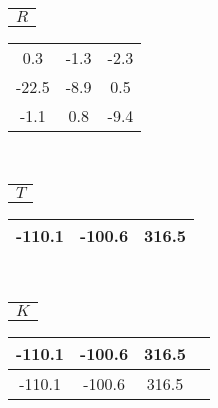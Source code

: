 \begin{table}
\begin{center}

\begin{tabular}{c}
$R$\\
\end{tabular}
\begin{tabular}{|ccc|}
\hline
  0.3 & -1.3 & -2.3 \\
-22.5  & -8.9 &  0.5 \\
 -1.1 &  0.8 & -9.4 \\
\hline
\end{tabular}
\\
\vspace{1mm}
\begin{tabular}{c}
$T$\\
\end{tabular}
\begin{tabular}{|ccc|}
\hline
-110.1 & -100.6 & 316.5\\
\hline
\end{tabular}
\\

\vspace{1mm}
\begin{tabular}{c}
$K$\\
\end{tabular}
\begin{tabular}{|cccc|}
\hline
-110.1 & -100.6 & 316.5\\
\hline
-110.1 & -100.6 & 316.5\\
\hline
\end{tabular}
\end{center}
\label{tab:cv2_pnp_err}
\iftog{}\else{
\vspace{-5pt }%
}\fi
\end{table}

